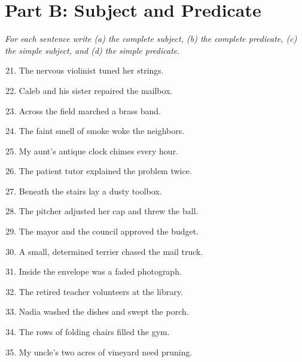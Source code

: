 \documentclass[11pt]{article}
\begin{document}
\section*{Part B: Subject and Predicate}
\noindent\textit{For each sentence write (a) the complete subject, (b) the complete predicate, (c) the simple subject, and (d) the simple predicate.}
\begin{enumerate}\setcounter{enumi}{20}
  \item The nervous violinist tuned her strings.
  \vspace{0.8in}
  \item Caleb and his sister repaired the mailbox.
  \vspace{0.8in}
  \item Across the field marched a brass band.
  \vspace{0.8in}
  \item The faint smell of smoke woke the neighbors.
  \vspace{0.8in}
  \item My aunt's antique clock chimes every hour.
  \vspace{0.8in}
  \item The patient tutor explained the problem twice.
  \vspace{0.8in}
  \item Beneath the stairs lay a dusty toolbox.
  \vspace{0.8in}
  \item The pitcher adjusted her cap and threw the ball.
  \vspace{0.8in}
  \item The mayor and the council approved the budget.
  \vspace{0.8in}
  \item A small, determined terrier chased the mail truck.
  \vspace{0.8in}
  \item Inside the envelope was a faded photograph.
  \vspace{0.8in}
  \item The retired teacher volunteers at the library.
  \vspace{0.8in}
  \item Nadia washed the dishes and swept the porch.
  \vspace{0.8in}
  \item The rows of folding chairs filled the gym.
  \vspace{0.8in}
  \item My uncle's two acres of vineyard need pruning.
  \vspace{0.8in}
\end{enumerate}
\end{document}
